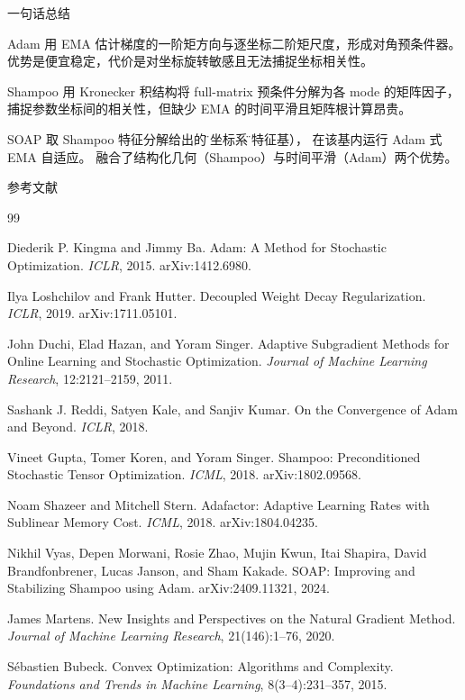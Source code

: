 \documentclass[aspectratio=169,10pt]{ctexbeamer}
\begin{document}
\begin{frame}{一句话总结}
\begin{block}{Adam}
用 EMA 估计梯度的一阶矩方向与逐坐标二阶矩尺度，形成对角预条件器。
优势是便宜稳定，代价是对坐标旋转敏感且无法捕捉坐标相关性。
\end{block}
\begin{block}{Shampoo}
用 Kronecker 积结构将 full-matrix 预条件分解为各 mode 的矩阵因子，
捕捉参数坐标间的相关性，但缺少 EMA 的时间平滑且矩阵根计算昂贵。
\end{block}
\begin{block}{SOAP}
取 Shampoo 特征分解给出的\"好坐标系\"（特征基），
在该基内运行 Adam 式 EMA 自适应。
融合了结构化几何（Shampoo）与时间平滑（Adam）两个优势。
\end{block}
\end{frame}

\begin{frame}{参考文献}
\footnotesize
\begin{thebibliography}{99}

Diederik P. Kingma and Jimmy Ba.
\newblock Adam: A Method for Stochastic Optimization.
\newblock \textit{ICLR}, 2015. arXiv:1412.6980.

Ilya Loshchilov and Frank Hutter.
\newblock Decoupled Weight Decay Regularization.
\newblock \textit{ICLR}, 2019. arXiv:1711.05101.

John Duchi, Elad Hazan, and Yoram Singer.
\newblock Adaptive Subgradient Methods for Online Learning and Stochastic Optimization.
\newblock \textit{Journal of Machine Learning Research}, 12:2121--2159, 2011.

Sashank J. Reddi, Satyen Kale, and Sanjiv Kumar.
\newblock On the Convergence of Adam and Beyond.
\newblock \textit{ICLR}, 2018.

Vineet Gupta, Tomer Koren, and Yoram Singer.
\newblock Shampoo: Preconditioned Stochastic Tensor Optimization.
\newblock \textit{ICML}, 2018. arXiv:1802.09568.

Noam Shazeer and Mitchell Stern.
\newblock Adafactor: Adaptive Learning Rates with Sublinear Memory Cost.
\newblock \textit{ICML}, 2018. arXiv:1804.04235.

Nikhil Vyas, Depen Morwani, Rosie Zhao, Mujin Kwun, Itai Shapira, David Brandfonbrener, Lucas Janson, and Sham Kakade.
\newblock SOAP: Improving and Stabilizing Shampoo using Adam.
\newblock arXiv:2409.11321, 2024.

James Martens.
\newblock New Insights and Perspectives on the Natural Gradient Method.
\newblock \textit{Journal of Machine Learning Research}, 21(146):1--76, 2020.

S\'ebastien Bubeck.
\newblock Convex Optimization: Algorithms and Complexity.
\newblock \textit{Foundations and Trends in Machine Learning}, 8(3--4):231--357, 2015.

\end{thebibliography}
\end{frame}
\end{document}
